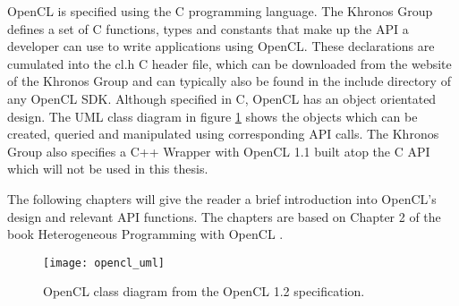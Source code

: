OpenCL is specified using the C programming language. The Khronos Group defines a set of C functions, types and constants that make up the API a developer can use to write applications using OpenCL. These declarations are cumulated into the cl.h C header file, which can be downloaded from the website of the Khronos Group and can typically also be found in the include directory of any OpenCL SDK. Although specified in C, OpenCL has an object orientated design. The UML class diagram in figure \ref{fig:opencl_uml} shows the objects which can be created, queried and manipulated using corresponding API calls. The Khronos Group also specifies a C++ Wrapper with OpenCL 1.1 built atop the C API which will not be used in this thesis.

The following chapters will give the reader a brief introduction into OpenCL's design and relevant API functions. The chapters are based on Chapter 2 of the book Heterogeneous Programming with OpenCL \cite[p.15-31]{opencl_book}.

\begin{figure}
\centering
\texttt{[image: opencl\_uml]}
\caption{OpenCL class diagram from the OpenCL 1.2 specification. \cite{opencl_spec}}
\label{fig:opencl_uml}
\end{figure}

